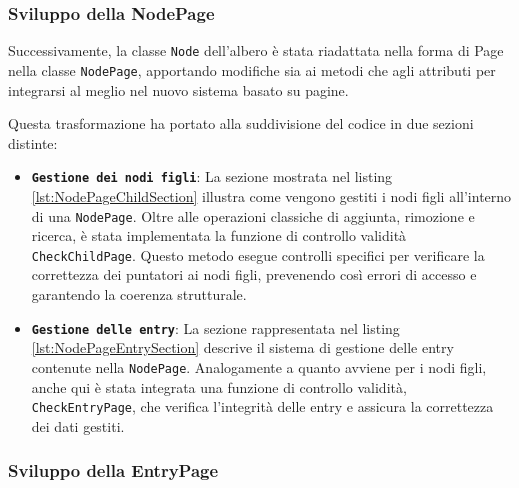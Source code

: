 \documentclass[12pt,a4paper,openright,twoside]{book}
\begin{document}
            \subsubsection{Sviluppo della NodePage}

                Successivamente, la classe \texttt{Node} dell'albero è stata riadattata nella forma di Page nella classe \texttt{NodePage}, apportando modifiche sia ai metodi che agli attributi per integrarsi al meglio nel nuovo sistema basato su pagine.

                Questa trasformazione ha portato alla suddivisione del codice in due sezioni distinte:

                \begin{itemize}
                    \item \textbf{\texttt{Gestione dei nodi figli}}: La sezione mostrata nel listing \cref{lst:NodePageChildSection} illustra come vengono gestiti i nodi figli all'interno di una \texttt{NodePage}. Oltre alle operazioni classiche di aggiunta, rimozione e ricerca, è stata implementata la funzione di controllo validità \texttt{CheckChildPage}. Questo metodo esegue controlli specifici per verificare la correttezza dei puntatori ai nodi figli, prevenendo così errori di accesso e garantendo la coerenza strutturale.

                    \item \textbf{\texttt{Gestione delle entry}}: La sezione rappresentata nel listing \cref{lst:NodePageEntrySection} descrive il sistema di gestione delle entry contenute nella \texttt{NodePage}. Analogamente a quanto avviene per i nodi figli, anche qui è stata integrata una funzione di controllo validità, \texttt{CheckEntryPage}, che verifica l'integrità delle entry e assicura la correttezza dei dati gestiti.
                \end{itemize}

            

            

            \clearpage

            \subsubsection{Sviluppo della EntryPage}
\end{document}
